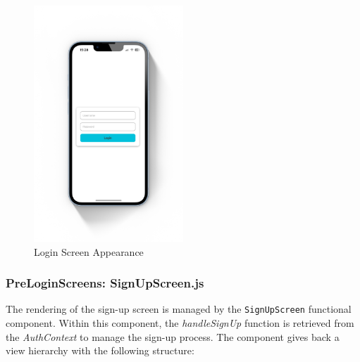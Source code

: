 \begin{figure}[!ht]
    \centering
    \includegraphics[width=0.5\textwidth]
    {LATEX/Appendices/Images/Software/Frontend/login_screen.png}
    \caption{Login Screen Appearance}
    \label{fig:login screen}
\end{figure}

\subsubsection{PreLoginScreens: SignUpScreen.js} 

The rendering of the sign-up screen is managed by the \texttt{SignUpScreen} functional component. Within this component, the \textit{handleSignUp} function is retrieved from the \textit{AuthContext} to manage the sign-up process. The component gives back a view hierarchy with the following structure:

